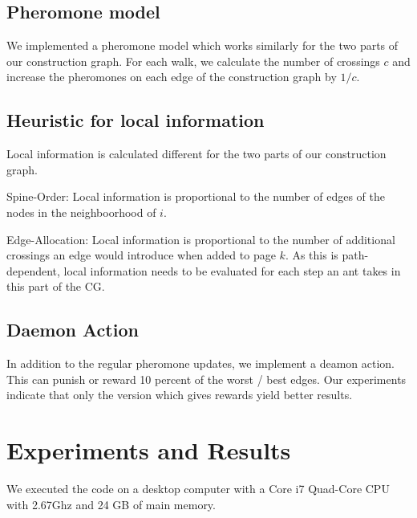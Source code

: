 \documentclass{scrartcl}
\begin{document}
\subsection{Pheromone model}
We implemented a pheromone model which works similarly for the two
parts of our construction graph. For each walk, we calculate the
number of crossings $c$ and increase the pheromones on each edge of the
construction graph by $1/c$.

\subsection{Heuristic for local information}
\label{local_information}

Local information is calculated different for the two parts of our construction graph.

\begin{description}

    \item{Spine-Order}: Local information is proportional to the number of edges of the
      nodes in the neighboorhood of $i$.              

    \item{Edge-Allocation}: Local information is proportional to the number of additional
      crossings an edge would introduce when added to page $k$. As this is path-dependent, local
      information needs to be evaluated for each step an ant takes in this part of the CG.
\end{description}

\subsection{Daemon Action}
\label{Deamon Action}
In addition to the regular pheromone updates, we implement a deamon
action. This can punish or reward 10 percent of the worst / best
edges. Our experiments indicate that only the version which gives
rewards yield better results.


\section{Experiments and Results}
We executed the code on a desktop computer with a Core i7 Quad-Core
CPU with 2.67Ghz and 24 GB of main memory. \\
\end{document}
